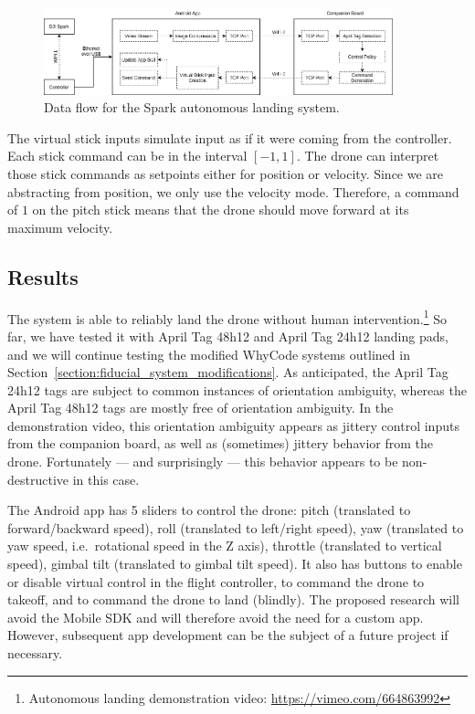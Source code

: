 \begin{figure}[ht]
    \centering
    \includegraphics[width=0.9\textwidth]{images/spark_architecture.drawio}
    \caption{Data flow for the Spark autonomous landing system.}
    \label{figure:spark_architecture}
\end{figure}

The virtual stick inputs simulate input as if it were coming from the controller.
Each stick command can be in the interval $[-1, 1]$.
The drone can interpret those stick commands as setpoints either for position or velocity.
Since we are abstracting from position, we only use the velocity mode.
Therefore, a command of $1$ on the pitch stick
means that the drone should move forward at its maximum velocity.

\subsection{Results}

The system is able to reliably land the drone without human intervention.\footnote{Autonomous landing demonstration video: \url{https://vimeo.com/664863992}}
So far, we have tested it with April Tag 48h12 and April Tag 24h12 landing pads,
and we will continue testing the modified WhyCode systems outlined in Section~\ref{section:fiducial_system_modifications}.
As anticipated, the April Tag 24h12 tags are subject to common instances of orientation ambiguity,
whereas the April Tag 48h12 tags are mostly free of orientation ambiguity.
In the demonstration video, this orientation ambiguity appears as jittery control inputs from the companion board,
as well as (sometimes) jittery behavior from the drone.
Fortunately --- and surprisingly --- this behavior appears to be non-destructive in this case.

The Android app has 5 sliders to control the drone:
pitch (translated to forward/backward speed),
roll (translated to left/right speed),
yaw (translated to yaw speed, i.e.~rotational speed in the Z axis),
throttle (translated to vertical speed),
gimbal tilt (translated to gimbal tilt speed).
It also has buttons to enable or disable virtual control in the flight controller,
to command the drone to takeoff,
and to command the drone to land (blindly).
The proposed research will avoid the Mobile SDK and will therefore avoid the need for a custom app.
However, subsequent app development can be the subject of a future project if necessary.

